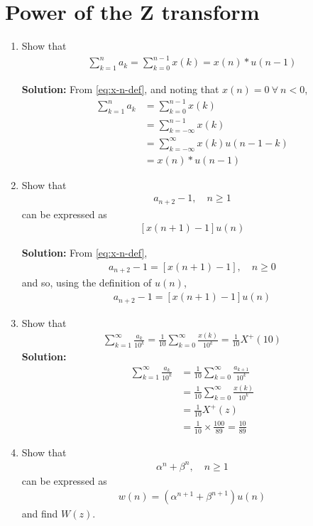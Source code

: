 \documentclass[journal,12pt,twocolumn]{IEEEtran}
\newcommand{\solution}{\noindent \textbf{Solution: }}
\providecommand{\brak}[1]{\ensuremath{\left(#1\right)}}
\providecommand{\sbrak}[1]{\ensuremath{\left[#1\right]}}
\numberwithin{equation}{section}
\renewcommand\thesection{\arabic{section}}
\begin{document}
\section{Power of the Z transform}
\begin{enumerate}[label=\thesection.\arabic*,ref=\thesection.\theenumi]
\item Show that 
\begin{align}
	\sum_{k=1}^{n}a_k = 
	\sum_{k=0}^{n-1}x(k) = x(n)*u(n-1)
\end{align}

\solution From \eqref{eq:x-n-def}, and noting that $x(n) = 0\ \forall\ n < 0$,
\begin{align}
    \sum_{k=1}^{n}a_k &= \sum_{k=0}^{n-1}x(k) \\
                      &= \sum_{k = -\infty}^{n - 1}x(k) \\
                      &= \sum_{k = -\infty}^{\infty}x(k)u(n - 1 - k) \\
                      &= x(n)*u(n - 1)
\end{align}
\item Show that 
\begin{align}
a_{n+2}-1, \quad n \ge 1
\end{align}
can be expressed as 
\begin{align}
	\sbrak{x\brak{n+1}-1}u\brak{n}
\end{align}

\solution From \eqref{eq:x-n-def},
\begin{align}
    a_{n+2} - 1 = \sbrak{x(n + 1) - 1}, \quad n \ge 0
\end{align}
and so, using the definition of $u(n)$,
\begin{align}
    a_{n+2} - 1 = \sbrak{x(n + 1) - 1}u(n)
\end{align}

\item Show that 
\begin{align}
	\sum_{k=1}^{\infty}\frac{a_k}{10^k}= 
	\frac{1}{10}\sum_{k=0}^{\infty}\frac{x\brak{k}}{10^k} =\frac{1}{10}X^{+}\brak{{10}}
\end{align}
\label{pr:1-2}
\solution 
\begin{align}
    \sum_{k=1}^{\infty}\frac{a_k}{10^k} &= \frac{1}{10}\sum_{k = 0}^{\infty}\frac{a_{k+1}}{10^k} \\
                                        &= \frac{1}{10}\sum_{k = 0}^{\infty}\frac{x(k)}{10^k} \\
                                        &= \frac{1}{10}X^+(z) \\
                                        &= \frac{1}{10}\times\frac{100}{89} = \frac{10}{89}
\end{align}
\item Show that 
\begin{align}
	\alpha^n + \beta^n, \quad n \ge 1
    \label{eq:yn-exp}
\end{align}
can be expressed as 
\begin{align}
	w(n) = \brak{\alpha^{n+1} + \beta^{n+1}}u(n)
\end{align}
and find $W(z)$.


\end{enumerate}
\end{document}
